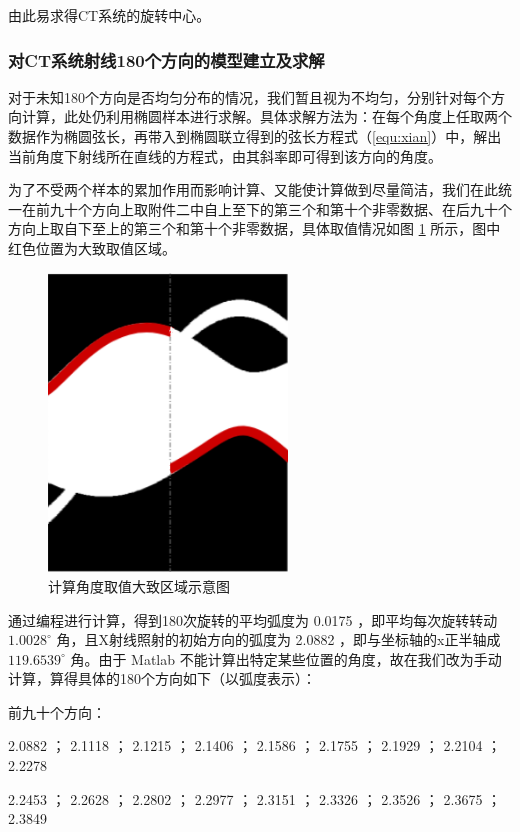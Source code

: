 \documentclass[UTF8]{ctexart}
\begin{document}
由此易求得CT系统的旋转中心。

\subsubsection{对CT系统射线180个方向的模型建立及求解}

对于未知180个方向是否均匀分布的情况，我们暂且视为不均匀，分别针对每个方向计算，此处仍利用椭圆样本进行求解。具体求解方法为：在每个角度上任取两个数据作为椭圆弦长，再带入到椭圆联立得到的弦长方程式（\ref{equ:xian}）中，解出当前角度下射线所在直线的方程式，由其斜率即可得到该方向的角度。

为了不受两个样本的累加作用而影响计算、又能使计算做到尽量简洁，我们在此统一在前九十个方向上取附件二中自上至下的第三个和第十个非零数据、在后九十个方向上取自下至上的第三个和第十个非零数据，具体取值情况如图 \ref{fig:angle} 所示，图中红色位置为大致取值区域。

\begin{figure}[htbp]
  \centering
  \includegraphics[width=2.5in]{../figure/angle.png}
  \caption{计算角度取值大致区域示意图}
  \label{fig:angle}
\end{figure}

通过编程进行计算，得到180次旋转的平均弧度为 0.0175 ，即平均每次旋转转动 $1.0028^{\circ}$ 角，且X射线照射的初始方向的弧度为 2.0882 ，即与坐标轴的x正半轴成 $119.6539^{\circ}$ 角。由于 Matlab 不能计算出特定某些位置的角度，故在我们改为手动计算，算得具体的180个方向如下（以弧度表示）：

前九十个方向：

2.0882 ； 2.1118 ； 2.1215 ； 2.1406 ； 2.1586 ； 2.1755 ； 2.1929 ； 2.2104 ； 2.2278

2.2453 ； 2.2628 ； 2.2802 ； 2.2977 ； 2.3151 ； 2.3326 ； 2.3526 ； 2.3675 ； 2.3849
\end{document}
